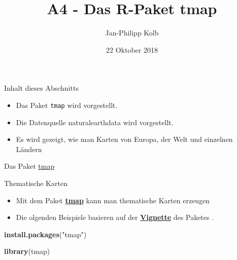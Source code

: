 \documentclass[ignorenonframetext,]{beamer}
\title{A4 - Das R-Paket tmap}
\author{Jan-Philipp Kolb}
\date{22 Oktober 2018}
\newenvironment{Shaded}{\begin{snugshade}}{\end{snugshade}}
\newcommand{\KeywordTok}[1]{\textcolor[rgb]{0.13,0.29,0.53}{\textbf{#1}}}
\newcommand{\NormalTok}[1]{#1}
\newcommand{\StringTok}[1]{\textcolor[rgb]{0.31,0.60,0.02}{#1}}
\providecommand{\tightlist}{%
  \setlength{\itemsep}{0pt}\setlength{\parskip}{0pt}}
\begin{document}
\frame{\titlepage}

\begin{frame}[fragile]{Inhalt dieses Abschnitts}
\protect\hypertarget{inhalt-dieses-abschnitts}{}

\begin{itemize}
\tightlist
\item
  Das Paket \texttt{tmap} wird vorgestellt.
\item
  Die Datenquelle naturalearthdata wird vorgestellt.
\item
  Es wird gezeigt, wie man Karten von Europa, der Welt und einzelnen
  Ländern
\end{itemize}

\end{frame}

\begin{frame}[fragile]{Das Paket
\href{https://cran.r-project.org/web/packages/tmap/index.html}{tmap}}
\protect\hypertarget{das-paket-tmap}{}

\begin{block}{Thematische Karten}

\begin{itemize}
\tightlist
\item
  Mit dem Paket
  \href{http://twitter.com/sharon000/status/593028906820599808/photo/1?ref_src=twsrc\%5Etfw}{\textbf{tmap}}
  kann man thematische Karten erzeugen
\item
  Die olgenden Beispiele basieren auf der
  \href{https://cran.r-project.org/web/packages/tmap/vignettes/tmap-nutshell.html}{\textbf{Vignette}}
  des Paketes .
\end{itemize}

\begin{Shaded}
\begin{Highlighting}[]
\KeywordTok{install.packages}\NormalTok{(}\StringTok{"tmap"}\NormalTok{)}
\end{Highlighting}
\end{Shaded}

\begin{Shaded}
\begin{Highlighting}[]
\KeywordTok{library}\NormalTok{(tmap)}
\end{Highlighting}
\end{Shaded}

\end{block}

\end{frame}
\end{document}
